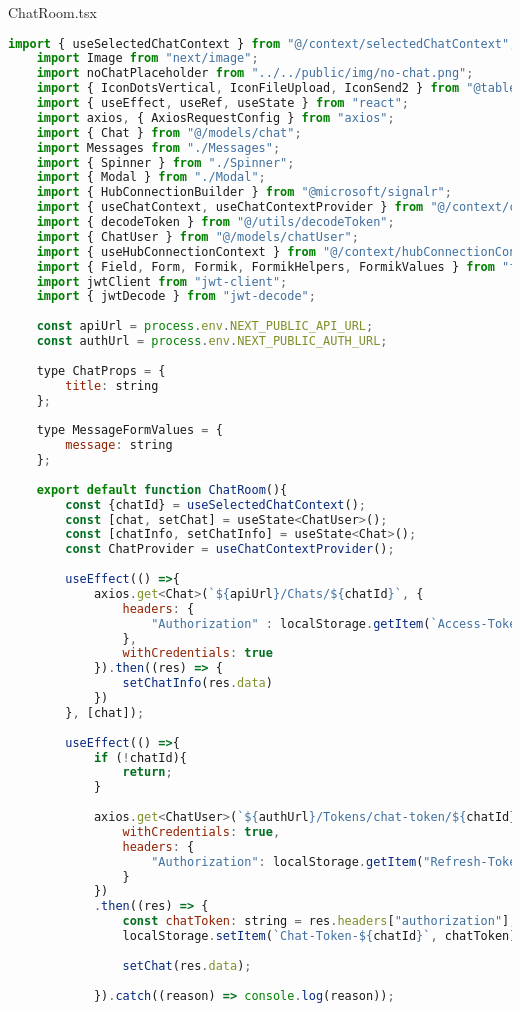 ChatRoom.tsx
\begin{lstlisting}[language=javascript]
	import { useSelectedChatContext } from "@/context/selectedChatContext";
	import Image from "next/image";
	import noChatPlaceholder from "../../public/img/no-chat.png";
	import { IconDotsVertical, IconFileUpload, IconSend2 } from "@tabler/icons-react";
	import { useEffect, useRef, useState } from "react";
	import axios, { AxiosRequestConfig } from "axios";
	import { Chat } from "@/models/chat";
	import Messages from "./Messages";
	import { Spinner } from "./Spinner";
	import { Modal } from "./Modal";
	import { HubConnectionBuilder } from "@microsoft/signalr";
	import { useChatContext, useChatContextProvider } from "@/context/chatContext";
	import { decodeToken } from "@/utils/decodeToken";
	import { ChatUser } from "@/models/chatUser";
	import { useHubConnectionContext } from "@/context/hubConnectionContext";
	import { Field, Form, Formik, FormikHelpers, FormikValues } from "formik";
	import jwtClient from "jwt-client"; 
	import { jwtDecode } from "jwt-decode";
	
	const apiUrl = process.env.NEXT_PUBLIC_API_URL;
	const authUrl = process.env.NEXT_PUBLIC_AUTH_URL;
	
	type ChatProps = {
		title: string
	};
	
	type MessageFormValues = {
		message: string
	};
	
	export default function ChatRoom(){
		const {chatId} = useSelectedChatContext();
		const [chat, setChat] = useState<ChatUser>();
		const [chatInfo, setChatInfo] = useState<Chat>();
		const ChatProvider = useChatContextProvider();
		
		useEffect(() =>{
			axios.get<Chat>(`${apiUrl}/Chats/${chatId}`, {
				headers: {
					"Authorization" : localStorage.getItem(`Access-Token`)
				}, 
				withCredentials: true
			}).then((res) => {
				setChatInfo(res.data)
			})
		}, [chat]);
		
		useEffect(() =>{
			if (!chatId){
				return;
			}
			
			axios.get<ChatUser>(`${authUrl}/Tokens/chat-token/${chatId}`, {
				withCredentials: true,
				headers: {
					"Authorization": localStorage.getItem("Refresh-Token")
				}
			})
			.then((res) => {
				const chatToken: string = res.headers["authorization"];
				localStorage.setItem(`Chat-Token-${chatId}`, chatToken);
				
				setChat(res.data);
				
			}).catch((reason) => console.log(reason));
			

\end{lstlisting}
